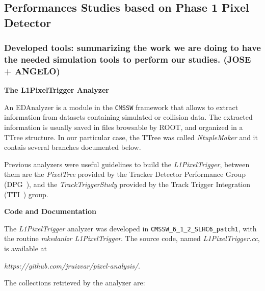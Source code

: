 \subsection{Performances Studies based on Phase 1 Pixel Detector}

\subsubsection{Developed tools: summarizing the work we are doing to have the needed simulation tools to perform our studies. (JOSE + ANGELO)}

\vspace{0.5 cm}
\textbf{The L1PixelTrigger Analyzer}

An EDAnalyzer is a module in the \texttt{CMSSW} framework that allows to extract information from datasets
containing simulated or collision data. The extracted information is usually saved in files browsable by ROOT,
and organized in a TTree structure. In our particular case, the TTree was called \textit{NtupleMaker} and it
contais several branches documented below.

Previous analyzers were useful guidelines to build the \textit{L1PixelTrigger}, between them are the
\textit{PixelTree} provided by the Tracker Detector Performance Group (DPG~\cite{ref:DPG}), and the \textit{TrackTriggerStudy}
provided by the Track Trigger Integration (TTI~\cite{ref:TTI}) group.

\vspace{0.5 cm}
\textbf{Code and Documentation}

The \textit{L1PixelTrigger} analyzer was developed in \texttt{CMSSW\_6\_1\_2\_SLHC6\_patch1}, with the routine
{\it mkedanlzr L1PixelTrigger}. The source code, named {\it L1PixelTrigger.cc}, is available at

{\it https://github.com/jruizvar/pixel-analysis/}. 

The collections retrieved by the analyzer are:

